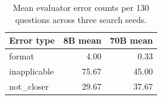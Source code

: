 \begin{table}[ht]
\centering
\caption{Mean evaluator error counts per 130 questions across three search seeds.}
\begin{tabular}{lrr}
\toprule
Error type & 8B mean & 70B mean \\
\midrule
format & 4.00 & 0.33 \\
inapplicable & 75.67 & 45.00 \\
not\_closer & 29.67 & 37.67 \\
\bottomrule
\end{tabular}
\end{table}
